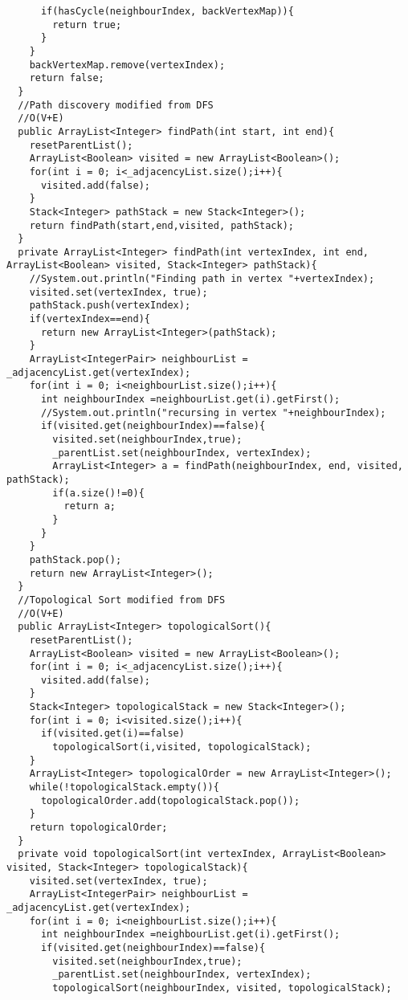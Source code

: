 \documentclass[11pt]{article}
\theoremstyle{definition}
\begin{document}
\begin{verbatim}
      if(hasCycle(neighbourIndex, backVertexMap)){
        return true;
      }
    }
    backVertexMap.remove(vertexIndex);
    return false;
  }
  //Path discovery modified from DFS
  //O(V+E)
  public ArrayList<Integer> findPath(int start, int end){
    resetParentList();
    ArrayList<Boolean> visited = new ArrayList<Boolean>();
    for(int i = 0; i<_adjacencyList.size();i++){
      visited.add(false);
    }
    Stack<Integer> pathStack = new Stack<Integer>();
    return findPath(start,end,visited, pathStack);
  }
  private ArrayList<Integer> findPath(int vertexIndex, int end, ArrayList<Boolean> visited, Stack<Integer> pathStack){
    //System.out.println("Finding path in vertex "+vertexIndex);
    visited.set(vertexIndex, true);
    pathStack.push(vertexIndex);
    if(vertexIndex==end){
      return new ArrayList<Integer>(pathStack);
    }
    ArrayList<IntegerPair> neighbourList =  _adjacencyList.get(vertexIndex);
    for(int i = 0; i<neighbourList.size();i++){
      int neighbourIndex =neighbourList.get(i).getFirst();
      //System.out.println("recursing in vertex "+neighbourIndex);
      if(visited.get(neighbourIndex)==false){
        visited.set(neighbourIndex,true);
        _parentList.set(neighbourIndex, vertexIndex);
        ArrayList<Integer> a = findPath(neighbourIndex, end, visited, pathStack);
        if(a.size()!=0){
          return a;
        }
      }
    }
    pathStack.pop();
    return new ArrayList<Integer>();
  }
  //Topological Sort modified from DFS
  //O(V+E)
  public ArrayList<Integer> topologicalSort(){
    resetParentList();
    ArrayList<Boolean> visited = new ArrayList<Boolean>();
    for(int i = 0; i<_adjacencyList.size();i++){
      visited.add(false);
    }
    Stack<Integer> topologicalStack = new Stack<Integer>();
    for(int i = 0; i<visited.size();i++){
      if(visited.get(i)==false)
        topologicalSort(i,visited, topologicalStack);
    }
    ArrayList<Integer> topologicalOrder = new ArrayList<Integer>();
    while(!topologicalStack.empty()){
      topologicalOrder.add(topologicalStack.pop());
    }
    return topologicalOrder;
  }
  private void topologicalSort(int vertexIndex, ArrayList<Boolean> visited, Stack<Integer> topologicalStack){
    visited.set(vertexIndex, true);
    ArrayList<IntegerPair> neighbourList =  _adjacencyList.get(vertexIndex);
    for(int i = 0; i<neighbourList.size();i++){
      int neighbourIndex =neighbourList.get(i).getFirst();
      if(visited.get(neighbourIndex)==false){
        visited.set(neighbourIndex,true);
        _parentList.set(neighbourIndex, vertexIndex);
        topologicalSort(neighbourIndex, visited, topologicalStack);

\end{verbatim}
\end{document}
